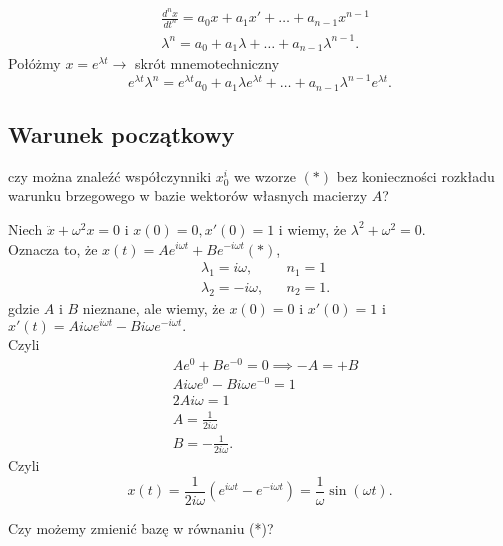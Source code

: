 \documentclass[../main.tex]{subfiles}
\begin{document}
\begin{przyklad}
\begin{align*}
                \\
                &\frac{d^nx}{dt^n} = a_0x + a_1x' + \ldots + a_{n-1}x^{n-1}\\
                &\lambda^n = a_0+a_1\lambda+\ldots+a_{n-1}\lambda^{n-1}
            .\end{align*}
            Połóżmy $x = e^{\lambda t}\to$ skrót mnemotechniczny\\
            \[
            e^{\lambda t}\lambda^n = e^{\lambda t}a_0 + a_1 \lambda e^{\lambda t} + \ldots + a_{n-1}\lambda^{n-1}e^{\lambda t}
            .\]
        \end{przyklad}

        \subsection{Warunek początkowy}
        czy można znaleźć współczynniki $x_0^i$ we wzorze $(*)$ bez konieczności rozkładu warunku brzegowego w bazie wektorów własnych macierzy $A$?
        \begin{przyklad}
            Niech $\ddot{x} + \omega^2 x = 0$ i $x(0) = 0, x'(0) = 1$ i wiemy, że $\lambda^2 + \omega^2 = 0$.\\
            Oznacza to, że $x(t) = A e^{i\omega t} + B e^{-i\omega t}(*)$,
            \begin{align*}
                &\lambda_1 = i\omega, &&n_1 = 1\\
                &\lambda_2 = -i\omega, &&n_2 = 1
            .\end{align*}
            gdzie $A$ i $B$ nieznane, ale wiemy, że $x(0) = 0$ i $x'(0) = 1$ i $x'(t) = Ai\omega e^{i\omega t} - Bi\omega e^{-i\omega t}.$\\
            Czyli
            \begin{align*}
            &Ae^{0}+Be^{-0}= 0 \implies -A = +B\\
            &Ai\omega e^{0}- Bi\omega e^{-0} = 1\\
            &2Ai\omega = 1\\
            &A = \frac{1}{2i\omega}\\
            &B = -\frac{1}{2i\omega}
            .\end{align*}
            Czyli
            \[
                x(t) = \frac{1}{2i\omega}\left( e^{i\omega t}- e^{-i\omega t} \right) = \frac{1}{\omega}\sin(\omega t)
            .\]
        \end{przyklad}
        \begin{pytanie}
            Czy możemy zmienić bazę w równaniu (*)?
        \end{pytanie}
\end{document}
